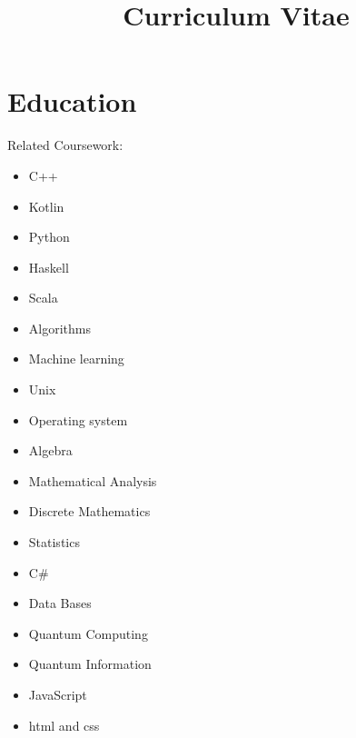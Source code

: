 \documentclass[11pt,a4paper,sans]{moderncv}        %
\title{Curriculum Vitae}
\begin{document}
	\vspace*{-1.05mm}
	\makecvtitle
	\vspace*{-10mm}
	
	\section{Education}
	{}{Related Coursework:}
	\vspace{-1.0em}\begin{small}
		\begin{multicols}{4}
			\begin{itemize}
				\item C++
				\item Kotlin
				\item Python
				\item Haskell
				\item Scala
				\item Algorithms
				\item Machine learning
				\item Unix
				\item Operating system
				\item Algebra
				\item Mathematical Analysis
				\item Discrete Mathematics
				\item Statistics
				\item C\#
				\item Data Bases
				\item Quantum Computing
				\item Quantum Information
				\item JavaScript
				\item html and css
			\end{itemize}
	\end{multicols}\end{small}
	
\end{document}
